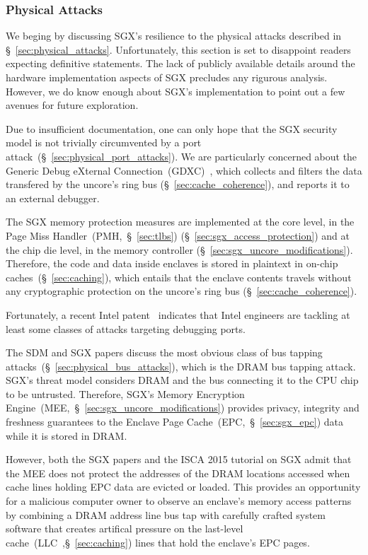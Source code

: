 \subsubsection{Physical Attacks}
\label{sec:sgx_vs_physical_attacks}

We beging by discussing SGX's resilience to the physical attacks described in
\S~\ref{sec:physical_attacks}. Unfortunately, this section is set to disappoint
readers expecting definitive statements. The lack of publicly available details
around the hardware implementation aspects of SGX precludes any rigurous
analysis. However, we do know enough about SGX's implementation to point out a
few avenues for future exploration.

Due to insufficient documentation, one can only hope that the SGX security
model is not trivially circumvented by a port
attack~(\S~\ref{sec:physical_port_attacks}). We are particularly concerned
about the Generic Debug eXternal
Connection~(GDXC)~\cite{yuffe2011sandybridge, intel2011gdxc}, which collects
and filters the data transfered by the uncore's ring bus
(\S~\ref{sec:cache_coherence}), and reports it to an external debugger.

The SGX memory protection measures are implemented at the core level, in the
Page Miss Handler~(PMH,~\S~\ref{sec:tlbs}) (\S~\ref{sec:sgx_access_protection})
and at the chip die level, in the memory controller
(\S~\ref{sec:sgx_uncore_modifications}). Therefore, the code and data inside
enclaves is stored in plaintext in on-chip caches~(\S~\ref{sec:caching}), which
entails that the enclave contents travels without any cryptographic protection
on the uncore's ring bus (\S~\ref{sec:cache_coherence}).

Fortunately, a recent Intel patent~\cite{shanbhogue2015gdxcsgx} indicates that
Intel engineers are tackling at least some classes of attacks targeting
debugging ports.

The SDM and SGX papers discuss the most obvious class of bus tapping
attacks~(\S~\ref{sec:physical_bus_attacks}), which is the DRAM bus tapping
attack. SGX's threat model considers DRAM and the bus connecting it to the CPU
chip to be untrusted. Therefore, SGX's Memory Encryption
Engine~(MEE,~\S~\ref{sec:sgx_uncore_modifications}) provides privacy, integrity
and freshness guarantees to the Enclave Page Cache~(EPC,~\S~\ref{sec:sgx_epc})
data while it is stored in DRAM.

However, both the SGX papers and the ISCA 2015 tutorial on SGX admit that the
MEE does not protect the addresses of the DRAM locations accessed when cache
lines holding EPC data are evicted or loaded. This provides an opportunity for
a malicious computer owner to observe an enclave's memory access patterns by
combining a DRAM address line bus tap with carefully crafted system software
that creates artifical pressure on the last-level
cache~(LLC~,\S~\ref{sec:caching}) lines that hold the enclave's EPC pages.

